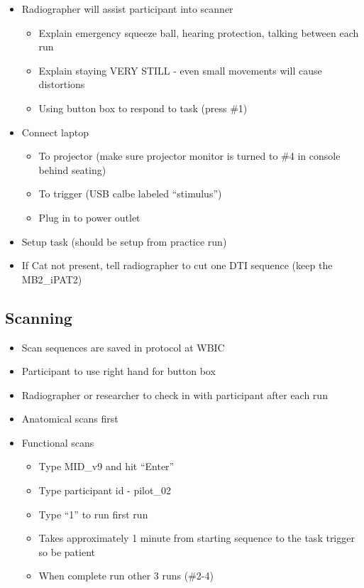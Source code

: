 \documentclass[
]{book}
\providecommand{\tightlist}{%
  \setlength{\itemsep}{0pt}\setlength{\parskip}{0pt}}
\begin{document}
\begin{itemize}
\tightlist
\item
  Radiographer will assist participant into scanner

  \begin{itemize}
  \tightlist
  \item
    Explain emergency squeeze ball, hearing protection, talking between each run
  \item
    Explain staying VERY STILL - even small movements will cause distortions
  \item
    Using button box to respond to task (press \#1)
  \end{itemize}
\item
  Connect laptop

  \begin{itemize}
  \tightlist
  \item
    To projector (make sure projector monitor is turned to \#4 in console behind seating)
  \item
    To trigger (USB calbe labeled ``stimulus'')
  \item
    Plug in to power outlet
  \end{itemize}
\item
  Setup task (should be setup from practice run)
\item
  If Cat not present, tell radiographer to cut one DTI sequence (keep the MB2\_iPAT2)
\end{itemize}

\hypertarget{scanning}{%
\subsection{Scanning}\label{scanning}}

\begin{itemize}
\tightlist
\item
  Scan sequences are saved in protocol at WBIC
\item
  Participant to use right hand for button box
\item
  Radiographer or researcher to check in with participant after each run
\item
  Anatomical scans first
\item
  Functional scans

  \begin{itemize}
  \tightlist
  \item
    Type MID\_v9 and hit ``Enter''
  \item
    Type participant id - pilot\_02
  \item
    Type ``1'' to run first run
  \item
    Takes approximately 1 minute from starting sequence to the task trigger so be patient
  \item
    When complete run other 3 runs (\#2-4)
  \end{itemize}
\end{itemize}
\end{document}
